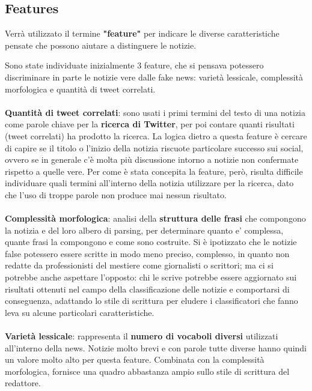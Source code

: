 \documentclass{article}
\begin{document}
\begin{multicols}{2}
	    \section{Features}
		    Verrà utilizzato il termine \textbf{"feature"} per indicare le diverse caratteristiche pensate che possono aiutare a distinguere le notizie.
		    
			Sono state individuate inizialmente 3 feature, che si pensava potessero discriminare in parte le notizie vere dalle fake news: varietà lessicale, complessità morfologica e quantità di tweet correlati. 				
			\\~\\
			\textbf{Quantità di tweet correlati}: sono usati i primi termini del testo di una notizia come parole chiave per la \textbf{ricerca di Twitter}, per poi contare quanti risultati (tweet correlati) ha prodotto la ricerca. La logica dietro a questa feature è cercare di capire se il titolo o l'inizio della notizia riscuote particolare successo sui social, ovvero se in generale c'è molta più discussione intorno a notizie non confermate rispetto a quelle vere. Per come è stata concepita la feature, però, risulta difficile individuare quali termini all'interno della notizia utilizzare per la ricerca, dato che l'uso di troppe parole non produce mai nessun risultato.
			\\~\\
			\textbf{Complessità morfologica}: analisi della \textbf{struttura delle frasi} che compongono la notizia e del loro albero di parsing, per determinare quanto e' complessa, quante frasi la compongono e come sono costruite.
			Si è ipotizzato che le notizie false potessero essere scritte in modo meno preciso, complesso, in quanto non redatte da professionisti del mestiere come giornalisti o scrittori; ma ci si potrebbe anche aspettare l'opposto: chi le scrive potrebbe essere aggiornato sui risultati ottenuti nel campo della classificazione delle notizie e comportarsi di conseguenza, adattando lo stile di scrittura per eludere i classificatori che fanno leva su alcune particolari caratteristiche.
			\\~\\
			\textbf{Varietà lessicale}: rappresenta il \textbf{numero di vocaboli diversi} utilizzati all'interno della news. Notizie molto brevi e con parole tutte diverse hanno quindi un valore molto alto per questa feature.
			Combinata con la complessità morfologica, fornisce una quadro abbastanza ampio sullo stile di scrittura del redattore.


\end{multicols}
\end{document}
